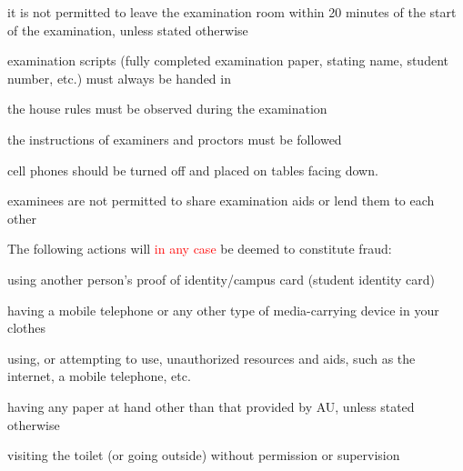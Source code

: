 \begin{coverpages}
\begin{minipage}{0.48\textwidth}
\begin{flushleft}
            \begin{coloritemize}[leftmargin=*, topsep=0pt]
                \setlength\itemsep{-0.2em}
                \item it is not permitted to leave the examination room within 20 minutes of the start of the examination, unless stated otherwise
                \item examination scripts (fully completed examination paper, stating name, student number, etc.) must always be handed in
                \item the house rules must be observed during the examination
                \item the instructions of examiners and proctors must be followed
                \item cell phones should be turned off and placed on tables facing down. 
                \item examinees are not permitted to share examination aids or lend them to each other
            \end{coloritemize}
        \end{flushleft}
    \end{minipage}
    \begin{minipage}{0.48\textwidth}
        \begin{flushleft}
            \footnotesize
            The following actions will \textcolor{red}{in any case} be deemed to constitute fraud:

            \begin{coloritemize}[leftmargin=*, topsep=0pt]
                \setlength\itemsep{-0.2em}
                \item using another person’s proof of identity/campus card (student identity card)
                \item having a mobile telephone or any other type of media-carrying device in your clothes
                \item using, or attempting to use, unauthorized resources and aids, such as the internet, a mobile telephone, etc.
                \item having any paper at hand other than that provided by AU, unless stated otherwise
                \item visiting the toilet (or going outside) without permission or supervision
            \end{coloritemize}
        \end{flushleft}
    \end{minipage}
    
\end{coverpages}

\makeatother
